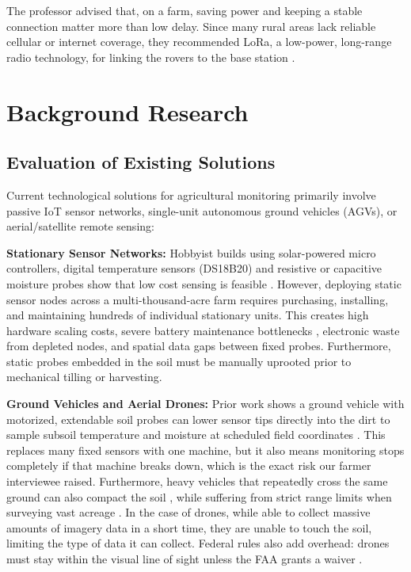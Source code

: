 \documentclass[12pt, letterpaper]{article}
\begin{document}
The professor advised that, on a farm, saving power and keeping a stable connection matter more than low delay. Since many rural areas lack reliable cellular or internet coverage, they recommended LoRa, a low-power, long-range radio technology, for linking the rovers to the base station \cite{rehman2017, jawad2017}.

\section{Background Research}

\subsection{Evaluation of Existing Solutions}

Current technological solutions for agricultural monitoring primarily involve passive IoT sensor networks, single-unit autonomous ground vehicles (AGVs), or aerial/satellite remote sensing:

\textbf{Stationary Sensor Networks:} Hobbyist builds using solar-powered micro controllers, digital temperature sensors (DS18B20) and resistive or capacitive moisture probes show that low cost sensing is feasible \cite{instructables2017}. However, deploying static sensor nodes across a multi-thousand-acre farm requires purchasing, installing, and maintaining hundreds of individual stationary units. This creates high hardware scaling costs, severe battery maintenance bottlenecks \cite{anastasi2009, jawad2017, khan2015}, electronic waste from depleted nodes, and spatial data gaps between fixed probes. Furthermore, static probes embedded in the soil must be manually uprooted prior to mechanical tilling or harvesting.

\textbf{Ground Vehicles and Aerial Drones:} Prior work shows a ground vehicle with motorized, extendable soil probes can lower sensor tips directly into the dirt to sample subsoil temperature and moisture at scheduled field coordinates \cite{shreyas2018}. This replaces many fixed sensors with one machine, but it also means monitoring stops completely if that machine breaks down, which is the exact risk our farmer interviewee raised. Furthermore, heavy vehicles that repeatedly cross the same ground can also compact the soil \cite{shaheb2021}, while suffering from strict range limits when surveying vast acreage \cite{shreyas2018}. In the case of drones, while able to collect massive amounts of imagery data in a short time, they are unable to touch the soil, limiting the type of data it can collect. Federal rules also add overhead: drones must stay within the visual line of sight unless the FAA grants a waiver \cite{faa2026}.
\end{document}

